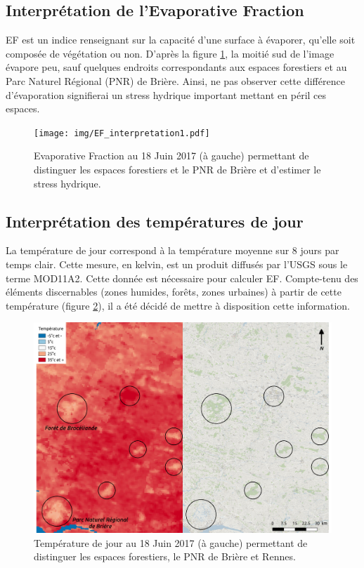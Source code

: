 \documentclass[10pt,a4paper]{article}
\begin{document}
\subsection{Interprétation de l'Evaporative Fraction}

EF est un indice renseignant sur la capacité d'une
surface à évaporer, qu’elle soit composée de végétation ou non. D'après la figure \ref{EF1}, la moitié sud de l'image évapore peu, sauf quelques endroits correspondants aux espaces forestiers et au Parc Naturel Régional (PNR) de Brière. Ainsi, ne pas observer cette différence d'évaporation signifierai un stress hydrique important mettant en péril ces espaces.

\begin{figure}[!h]
\centering
\texttt{[image: img/EF\_interpretation1.pdf]}
\caption{Evaporative Fraction au 18 Juin 2017 (à gauche) permettant de distinguer les espaces forestiers et le PNR de Brière et d'estimer le stress hydrique.}
\label{EF1}
\end{figure}

\subsection{Interprétation des températures de jour}

La température de jour correspond à la température moyenne sur 8 jours par temps clair. Cette mesure, en kelvin, est un produit diffusés par l'USGS sous le terme MOD11A2. Cette donnée est nécessaire pour calculer EF. Compte-tenu des éléments discernables (zones humides, forêts, zones urbaines) à partir de cette température (figure \ref{TJ1}), il a été décidé de mettre à disposition cette information. \smallbreak

\begin{figure}[!h]
\centering
\includegraphics[scale=0.33]{img/TJ_interpretation1.pdf}
\caption{Température de jour au 18 Juin 2017 (à gauche) permettant de distinguer les espaces forestiers, le PNR de Brière et Rennes.}
\label{TJ1}
\end{figure}
\end{document}
